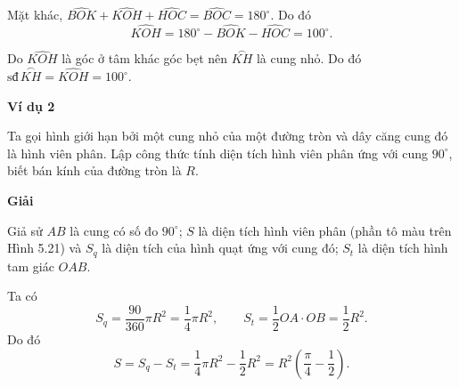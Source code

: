 \begin{lesson}
    Mặt khác, $\widehat{BOK}+\widehat{KOH}+\widehat{HOC}=\widehat{BOC}=180^\circ$. Do đó
    \[
        \widehat{KOH}=180^\circ-\widehat{BOK}-\widehat{HOC}=100^\circ.
    \]

    Do $\widehat{KOH}$ là góc ở tâm khác góc bẹt nên $\overset{\frown}{KH}$ là cung nhỏ. Do đó $\text{sđ}\,\overset{\frown}{KH}=\widehat{KOH}=100^\circ$.

    \textbf{Ví dụ 2}

    Ta gọi hình giới hạn bởi một cung nhỏ của một đường tròn và dây căng cung đó là hình viên phân. Lập công thức tính diện tích hình viên phân ứng với cung $90^\circ$, biết bán kính của đường tròn là $R$.


    \textbf{Giải}

    Giả sử $AB$ là cung có số đo $90^\circ$; $S$ là diện tích hình viên phân (phần tô màu trên Hình 5.21) và $S_q$ là diện tích của hình quạt ứng với cung đó; $S_t$ là diện tích hình tam giác $OAB$.

    Ta có
    \[
        S_q=\dfrac{90}{360}\pi R^2=\dfrac{1}{4}\pi R^2,\qquad
        S_t=\dfrac{1}{2}OA\cdot OB=\dfrac{1}{2}R^2.
    \]
    Do đó
    \[
        S=S_q-S_t=\dfrac{1}{4}\pi R^2-\dfrac{1}{2}R^2
        =R^2\left(\dfrac{\pi}{4}-\dfrac{1}{2}\right).
    \]
\end{lesson}

